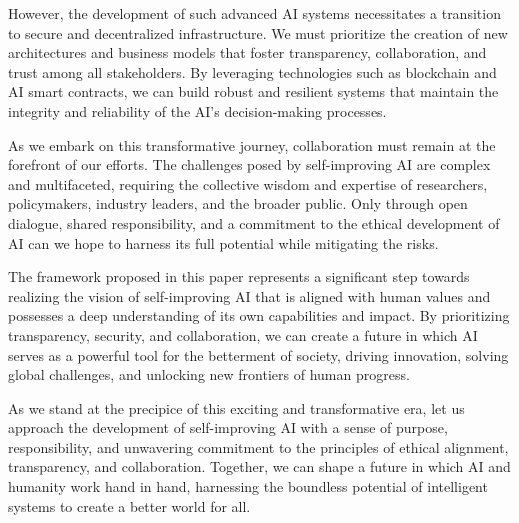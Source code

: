 \documentclass[conference]{article}
\begin{document}
	However, the development of such advanced AI systems necessitates a transition to secure and decentralized infrastructure. We must prioritize the creation of new architectures and business models that foster transparency, collaboration, and trust among all stakeholders. By leveraging technologies such as blockchain and AI smart contracts, we can build robust and resilient systems that maintain the integrity and reliability of the AI's decision-making processes.
	
	As we embark on this transformative journey, collaboration must remain at the forefront of our efforts. The challenges posed by self-improving AI are complex and multifaceted, requiring the collective wisdom and expertise of researchers, policymakers, industry leaders, and the broader public. Only through open dialogue, shared responsibility, and a commitment to the ethical development of AI can we hope to harness its full potential while mitigating the risks.
	
	The framework proposed in this paper represents a significant step towards realizing the vision of self-improving AI that is aligned with human values and possesses a deep understanding of its own capabilities and impact. By prioritizing transparency, security, and collaboration, we can create a future in which AI serves as a powerful tool for the betterment of society, driving innovation, solving global challenges, and unlocking new frontiers of human progress.
	
	As we stand at the precipice of this exciting and transformative era, let us approach the development of self-improving AI with a sense of purpose, responsibility, and unwavering commitment to the principles of ethical alignment, transparency, and collaboration. Together, we can shape a future in which AI and humanity work hand in hand, harnessing the boundless potential of intelligent systems to create a better world for all.
	
	
	
\end{document}
